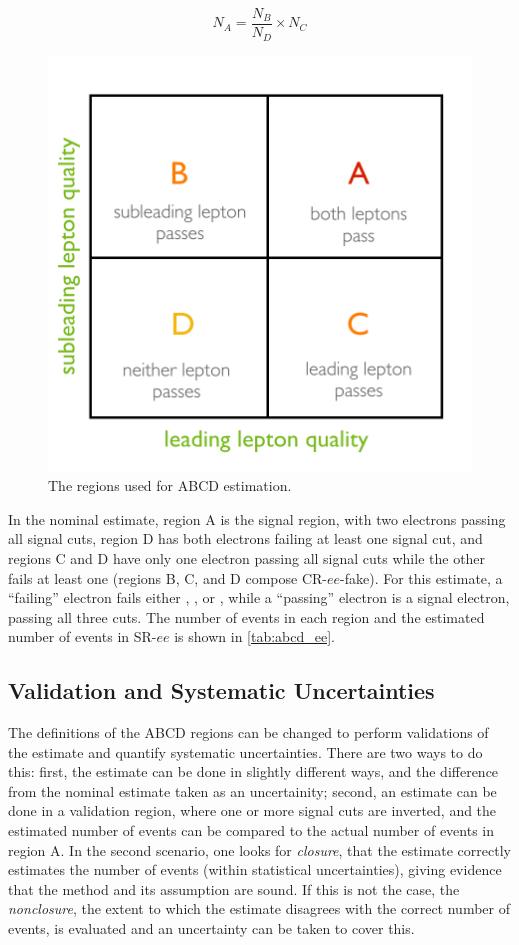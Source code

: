 \begin{equation}
N_A = \frac{N_B}{N_D}\times N_C
\end{equation}


\begin{figure}[htbp]
\centering
\includegraphics[width=.5\textwidth]{figures/otherbackgrounds/abcd.png}
\caption{The regions used for ABCD estimation.}
\label{fig:abcd}
\end{figure}


In the nominal estimate, region A is the signal region, with two electrons passing all signal cuts, region D has both electrons failing at least one signal cut, and regions C and D have only one electron passing all signal cuts while the other fails at least one (regions B, C, and D compose CR-$ee$-fake). For this estimate, a ``failing'' electron fails either \dpt, \chiID, or \nmiss, while a ``passing'' electron is a signal electron, passing all three cuts. The number of events in each region and the estimated number of events in SR-$ee$ is shown in \autoref{tab:abcd_ee}.

\subsection{Validation and Systematic Uncertainties}
The definitions of the ABCD regions can be changed to perform validations of the estimate and quantify systematic uncertainties. There are two ways to do this: first, the estimate can be done in slightly different ways, and the difference from the nominal estimate taken as an uncertainity; second, an estimate can be done in a validation region, where one or more signal cuts are inverted, and the estimated number of events can be compared to the actual number of events in region A. In the second scenario, one looks for \emph{closure}, that the estimate correctly estimates the number of events (within statistical uncertainties), giving evidence that the method and its assumption are sound. If this is not the case, the \emph{nonclosure}, the extent to which the estimate disagrees with the correct number of events, is evaluated and an uncertainty can be taken to cover this.

